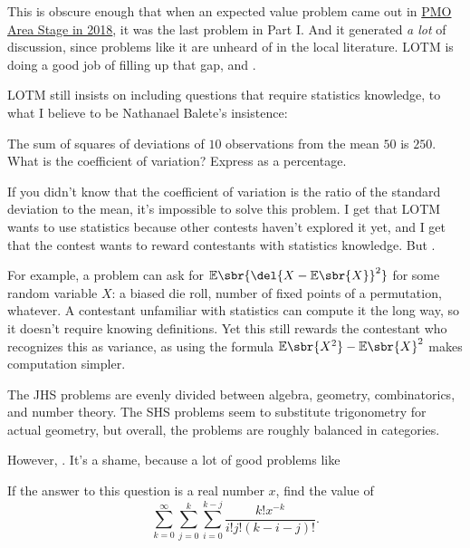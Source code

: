 \documentclass[11pt,paper=letter]{scrartcl}
\begin{document}
This is obscure enough that when an expected value problem came out in \href{http://cjquines.com/files/pmo2018areas.pdf}{PMO Area Stage in 2018}, it was the last problem in Part I. And it generated \emph{a lot} of discussion, since problems like it are unheard of in the local literature. LOTM is doing a good job of filling up that gap, and .

LOTM still insists on including questions that require statistics knowledge, to what I believe to be Nathanael Balete's insistence:

\begin{probboxed}
   The sum of squares of deviations of $10$ observations from the mean $50$ is $250$. What is the coefficient of variation? Express as a percentage.
\end{probboxed}

If you didn't know that the coefficient of variation is the ratio of the standard deviation to the mean, it's impossible to solve this problem. I get that LOTM wants to use statistics because other contests haven't explored it yet, and I get that the contest wants to reward contestants with statistics knowledge. But .

For example, a problem can ask for $\mathbb{E}\sbr{\del{X - \mathbb{E}\sbr{X}}^2}$ for some random variable $X$: a biased die roll, number of fixed points of a permutation, whatever. A contestant unfamiliar with statistics can compute it the long way, so it doesn't require knowing definitions. Yet this still rewards the contestant who recognizes this as variance, as using the formula $\mathbb{E}\sbr{X^2} - \mathbb{E}\sbr{X}^2$ makes computation simpler.

The JHS problems are evenly divided between algebra, geometry, combinatorics, and number theory. The SHS problems seem to substitute trigonometry for actual geometry, but overall, the problems are roughly balanced in categories.

However, . It's a shame, because a lot of good problems like

\begin{probboxed}
   If the answer to this question is a real number $x$, find the value of $$\sum_{k=0}^{\infty}\sum_{j=0}^k\sum_{i=0}^{k-j} \frac{k!x^{-k}}{i!j!(k-i-j)!}.$$
\end{probboxed}
\end{document}
